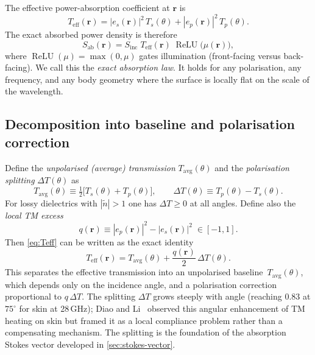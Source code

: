 \documentclass[11pt,a4paper]{article}
\theoremstyle{definition}      %
\newcommand{\rr}{\mathbf{r}}
\newcommand{\Sinc}{S_{\mathrm{inc}}}
\newcommand{\Sab}{S_{\mathrm{ab}}}
\newcommand{\Teff}{T_{\mathrm{eff}}}
\newcommand{\Tavg}{T_{\mathrm{avg}}}
\newcommand{\ntilde}{\tilde{n}}
\DeclareMathOperator{\ReLU}{ReLU}
\begin{document}
The effective power-absorption coefficient at $\rr$ is
\begin{equation}\label{eq:Teff}
  \Teff(\rr) = |e_s(\rr)|^2\,T_s(\theta) + |e_p(\rr)|^2\,T_p(\theta).
\end{equation}
The exact absorbed power density is therefore
\begin{equation}\label{eq:Sab-exact}
  \boxed{\Sab(\rr) = \Sinc\;\Teff(\rr)\;\ReLU\!\bigl(\mu(\rr)\bigr),}
\end{equation}
where $\ReLU(\mu)=\max(0,\mu)$ gates illumination (front-facing versus
back-facing).  We call this the \emph{exact absorption law}.  It holds
for any polarisation, any frequency, and any body geometry where the
surface is locally flat on the scale of the wavelength.

\subsection{Decomposition into baseline and polarisation correction}
\label{sec:Teff-decompose}

Define the \emph{unpolarised (average) transmission} $\Tavg(\theta)$ and the
\emph{polarisation splitting} $\Delta T(\theta)$ as
\begin{equation}\label{eq:Tavg-DeltaT}
  \Tavg(\theta) \equiv \tfrac{1}{2}\bigl[T_s(\theta)+T_p(\theta)\bigr],
  \qquad
  \Delta T(\theta) \equiv T_p(\theta) - T_s(\theta).
\end{equation}
For lossy dielectrics with $|\ntilde|>1$ one has $\Delta T\ge 0$ at
all angles.  Define also the \emph{local TM excess}
\begin{equation}\label{eq:q-def}
  q(\rr) \equiv |e_p(\rr)|^2 - |e_s(\rr)|^2 \;\in [-1,1].
\end{equation}
Then \cref{eq:Teff} can be written as the exact identity
\begin{equation}\label{eq:Teff-decomp}
  \boxed{\Teff(\rr) = \Tavg(\theta)
    + \frac{q(\rr)}{2}\,\Delta T(\theta).}
\end{equation}
This separates the effective transmission into an
unpolarised baseline~$\Tavg(\theta)$, which depends only on
the incidence angle, and a polarisation correction proportional
to $q\,\Delta T$.  The splitting $\Delta T$ grows steeply with
angle (reaching 0.83 at $75^\circ$ for skin at 28\,GHz); Diao and
Li~\cite{Diao2021} observed this angular enhancement of TM
heating on skin but framed it as a local compliance problem rather
than a compensating mechanism.  The splitting is the foundation of
the absorption Stokes vector developed in
\cref{sec:stokes-vector}.
\end{document}
